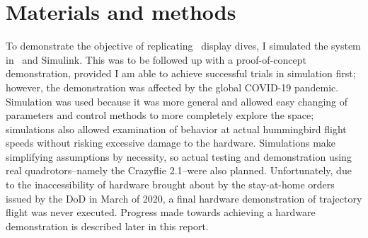 \section{Materials and methods}
\label{sec:methods}

To demonstrate the objective of replicating \Canna\ display dives,  I simulated the system in \MATLAB\ and Simulink.  This was to be followed up with a proof-of-concept demonstration, provided I am able to achieve successful trials in simulation first; however, the demonstration was affected by the global COVID-19 pandemic. Simulation was used because it was more general and allowed easy changing of parameters and control methods to more completely explore the space; simulations also allowed examination of behavior at actual hummingbird flight speeds without risking excessive damage to the hardware. Simulations make simplifying assumptions by necessity, so actual testing and demonstration using real quadrotors--namely the Crazyflie 2.1--were also planned. Unfortunately, due to the inaccessibility of hardware brought about by the stay-at-home orders issued by the DoD in March of 2020, a final hardware demonstration of trajectory flight was never executed. Progress made towards achieving a hardware demonstration is described later in this report.  

